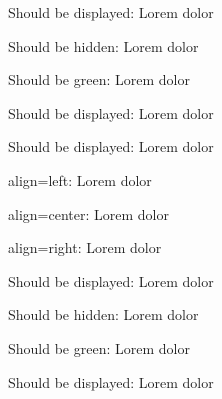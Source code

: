 


{}


Should be displayed: Lorem dolor

Should be hidden: Lorem  dolor

Should be green: Lorem  dolor

Should be displayed: Lorem  dolor

Should be displayed: Lorem  dolor



align=left: Lorem  dolor

align=center: Lorem  dolor

align=right: Lorem  dolor

Should be displayed: Lorem dolor

Should be hidden: Lorem  dolor

Should be green: Lorem  dolor

Should be displayed: Lorem  dolor

\bye
